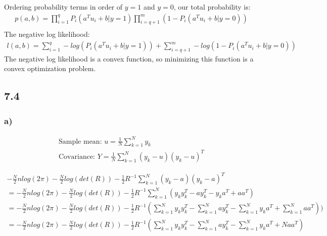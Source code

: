 \documentclass[12pt]{article}
\newenvironment{proposition}[2][Proposition]{\begin{trivlist}
\item[\hskip \labelsep {\bfseries #1}\hskip \labelsep {\bfseries #2.}]}{\end{trivlist}}
\begin{document}
Ordering probability terms in order of $y=1$ and $y=0$, our total probability is:
\begin{equation*}
\begin{aligned}
p(a,b) = \prod_{i=1}^{q}P_i(a^Tu_i+b|y=1)\prod_{i=q+1}^{m}(1-P_i(a^Tu_i+b|y=0))\\
\end{aligned}
\end{equation*}
The negative log likelihood:
\begin{equation*}
\begin{aligned}
l(a,b) = \sum_{i=1}^{q}-log(P_i(a^Tu_i+b|y=1))+\sum_{i=q+1}^{m}-log(1-P_i(a^Tu_i+b|y=0))
\end{aligned}
\end{equation*}
The negative log likelihood is a convex function, so minimizing this function is a convex optimization problem.

\subsection*{7.4}
\subsubsection*{a)}
\begin{proposition}{1}
\begin{align}
\text{Sample mean: }
u = \frac{1}{N}\sum_{k=1}^{N}y_k\\
\text{Covariance: }
Y = \frac{1}{N}\sum_{k=1}^{N}(y_k-u)(y_k-u)^T
\end{align}
\end{proposition}

\begin{equation*}
\begin{aligned}
-\frac{N}{2}nlog(2\pi)-\frac{N}{2}log(det(R))- \frac{1}{2}R^{-1}\sum_{k=1}^{N}(y_k-a)(y_k-a)^T\\
= -\frac{N}{2}nlog(2\pi)-\frac{N}{2}log(det(R))- \frac{1}{2}R^{-1}\sum_{k=1}^{N}(y_ky_k^T-ay_k^T-y_ka^T+aa^T)\\
= -\frac{N}{2}nlog(2\pi)-\frac{N}{2}log(det(R))- \frac{1}{2}R^{-1}(\sum_{k=1}^{N}y_ky_k^T-\sum_{k=1}^{N}ay_k^T-\sum_{k=1}^{N}y_ka^T+\sum_{k=1}^{N}aa^T))\\
= -\frac{N}{2}nlog(2\pi)-\frac{N}{2}log(det(R))- \frac{1}{2}R^{-1}(\sum_{k=1}^{N}y_ky_k^T-\sum_{k=1}^{N}ay_k^T-\sum_{k=1}^{N}y_ka^T+Naa^T)\\
\end{aligned}
\end{equation*}
\end{document}
